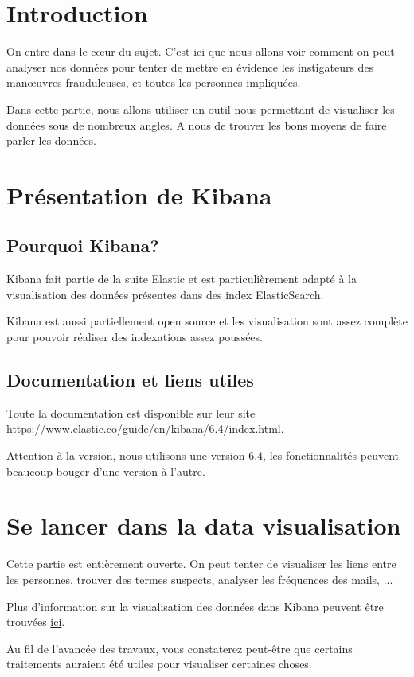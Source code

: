 \documentclass[11pt,letterpaper]{article}
\begin{document}
	\pagestyle{fancy}
	\section*{Introduction}
	On entre dans le cœur du sujet. C'est ici que nous allons voir comment on peut analyser nos données pour tenter de mettre en évidence les instigateurs des manœuvres frauduleuses, et toutes les personnes impliquées.
	
	Dans cette partie, nous allons utiliser un outil nous permettant de visualiser les données sous de nombreux angles. A nous de trouver les bons moyens de faire parler les données.
	\section*{Présentation de Kibana}
	\subsection*{Pourquoi Kibana?}
	Kibana fait partie de la suite Elastic et est particulièrement adapté à la visualisation des données présentes dans des index ElasticSearch.
	
	Kibana est aussi partiellement open source et les visualisation sont assez complète pour pouvoir réaliser des indexations assez poussées.
	\subsection*{Documentation et liens utiles}
		Toute la documentation est disponible sur leur site 
	\url{https://www.elastic.co/guide/en/kibana/6.4/index.html}.
	
	Attention à la version, nous utilisons une version 6.4, les fonctionnalités peuvent beaucoup bouger d'une version à l'autre.
	
	\section*{Se lancer dans la data visualisation}
	Cette partie est entièrement ouverte. On peut tenter de visualiser les liens entre les personnes, trouver des termes suspects, analyser les fréquences des mails, ...
	
	Plus d'information sur la visualisation des données dans Kibana peuvent être trouvées \href{https://www.elastic.co/guide/en/kibana/6.4/tutorial-build-dashboard.html}{ici}.
	
	Au fil de l'avancée des travaux, vous constaterez peut-être que certains traitements auraient été utiles pour visualiser certaines choses. 
	
\end{document}
